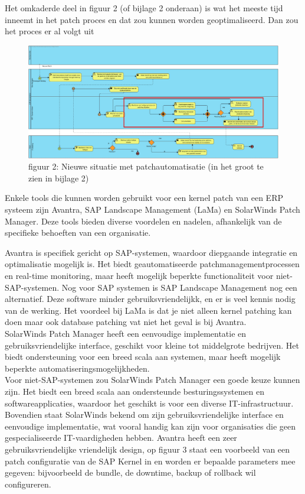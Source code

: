 \documentclass[dutch,dit,thesis]{hogentreport}
\begin{document}
Het omkaderde deel in figuur 2 (of bijlage 2 onderaan) is wat het meeste tijd inneemt in het patch proces en dat zou kunnen worden geoptimaliseerd. Dan zou het proces er al volgt uit


 \begin{figure}[htbp]
    \centering
    \includegraphics[width=\textwidth]{huidigesituatie2.png}
    \caption{figuur 2: Nieuwe situatie met patchautomatisatie (in het groot te zien in bijlage 2)}
     \label{fig:huidigesituatie2}
\end{figure}



Enkele tools die kunnen worden gebruikt voor een kernel patch van een ERP systeem zijn Avantra, SAP Landscape Management (LaMa) en SolarWinds Patch Manager. Deze tools bieden diverse voordelen en nadelen, afhankelijk van de specifieke behoeften van een organisatie.

 Avantra is specifiek gericht op SAP-systemen, waardoor diepgaande integratie en optimalisatie mogelijk is. Het biedt geautomatiseerde patchmanagementprocessen en real-time monitoring, maar heeft 
 mogelijk beperkte functionaliteit voor niet-SAP-systemen. Nog voor SAP systemen is SAP Landscape Management nog een alternatief. Deze software minder gebruiksvriendelijkk, en er is veel kennis nodig van de werking. Het voordeel 
 bij LaMa is dat je niet alleen kernel patching kan doen maar ook database patching vat niet het geval is bij Avantra. \\
 SolarWinds Patch Manager heeft een eenvoudige implementatie en gebruiksvriendelijke interface, geschikt voor kleine tot middelgrote bedrijven. Het biedt ondersteuning voor een breed scala aan 
 systemen, maar heeft mogelijk beperkte automatiseringsmogelijkheden. \\


 Voor niet-SAP-systemen zou SolarWinds Patch Manager een goede keuze kunnen zijn. Het biedt een breed scala aan ondersteunde besturingssystemen en softwareapplicaties, waardoor het geschikt is voor
  een diverse IT-infrastructuur. Bovendien staat SolarWinds bekend om zijn gebruiksvriendelijke interface en eenvoudige implementatie, wat vooral handig kan zijn voor organisaties die geen gespecialiseerde IT-vaardigheden hebben.
 Avantra heeft een zeer gebruiksvriendelijke vriendelijk design, op figuur 3 staat een voorbeeld van een patch configuratie van de SAP Kernel in en worden er bepaalde parameters mee gegeven: bijvoorbeeld de bundle, de downtime, backup of 
 rollback wil configureren.
 
\end{document}
